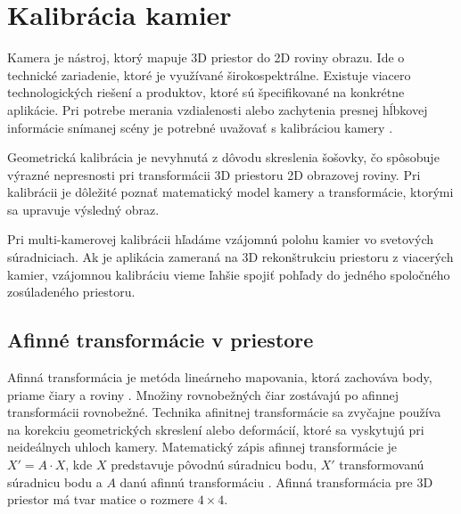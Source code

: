 \chapter{Kalibrácia kamier} 
\label{kap:kalibracia}
\pagestyle{fancy}
\fancyhf{}
\fancyfoot[CE,CO]{\thepage}
\renewcommand{\footrulewidth}{1pt}


Kamera je nástroj, ktorý mapuje 3D priestor do 2D roviny obrazu. Ide o technické zariadenie, ktoré je využívané širokospektrálne. Existuje viacero technologických riešení a produktov, ktoré sú špecifikované na konkrétne aplikácie. Pri potrebe merania vzdialenosti alebo zachytenia presnej hĺbkovej informácie snímanej scény je potrebné uvažovať s kalibráciou kamery \cite{zhang2000flexible}. 

Geometrická kalibrácia je nevyhnutá z dôvodu skreslenia šošovky, čo spôsobuje výrazné nepresnosti pri transformácii 3D priestoru 2D obrazovej roviny. Pri kalibrácii je dôležité poznať matematický model kamery a transformácie, ktorými sa upravuje výsledný obraz. 

Pri multi-kamerovej kalibrácii hľadáme vzájomnú polohu kamier vo svetových súradniciach. Ak je aplikácia zameraná na 3D rekonštrukciu priestoru z viacerých kamier, vzájomnou kalibráciu vieme ľahšie spojiť pohľady do jedného spoločného zosúladeného priestoru. 


\section{Afinné transformácie v priestore}
\label{sec:afine}


Afinná transformácia je metóda lineárneho mapovania, ktorá zachováva body, priame čiary a roviny \cite{affine}. Množiny rovnobežných čiar zostávajú po afinnej transformácii rovnobežné. Technika afinitnej transformácie sa zvyčajne používa na korekciu geometrických skreslení alebo deformácií, ktoré sa vyskytujú pri neideálnych uhloch kamery. Matematický zápis afinnej transformácie je $X'=A\cdot X$, kde $X$ predstavuje pôvodnú súradnicu bodu, $X'$ transformovanú súradnicu bodu a $A$ danú afinnú transformáciu \cite{affine1}. Afinná transformácia pre 3D priestor má tvar matice o rozmere $4\times 4$.\newline

